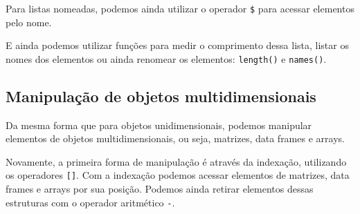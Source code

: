 \documentclass[
]{book}
\newenvironment{Shaded}{\begin{snugshade}}{\end{snugshade}}
\newcommand{\CommentTok}[1]{\textcolor[rgb]{0.37,0.37,0.37}{\textit{#1}}}
\newcommand{\DecValTok}[1]{\textcolor[rgb]{0.06,0.06,0.06}{#1}}
\newcommand{\DocumentationTok}[1]{\textcolor[rgb]{0.37,0.37,0.37}{\textbf{\textit{#1}}}}
\newcommand{\FunctionTok}[1]{\textcolor[rgb]{0,0,0}{#1}}
\newcommand{\NormalTok}[1]{#1}
\newcommand{\OtherTok}[1]{\textcolor[rgb]{0.37,0.37,0.37}{#1}}
\newcommand{\SpecialCharTok}[1]{\textcolor[rgb]{0,0,0}{#1}}
\newcommand{\StringTok}[1]{\textcolor[rgb]{0.5,0.5,0.5}{#1}}
\begin{document}
Para listas nomeadas, podemos ainda utilizar o operador \texttt{\$} para acessar elementos pelo nome.

\begin{Shaded}
\end{Shaded}

E ainda podemos utilizar funções para medir o comprimento dessa lista, listar os nomes dos elementos ou ainda renomear os elementos: \texttt{length()} e \texttt{names()}.

\begin{Shaded}
\end{Shaded}

\hypertarget{manipulauxe7uxe3o-de-objetos-multidimensionais}{%
\subsection{Manipulação de objetos multidimensionais}\label{manipulauxe7uxe3o-de-objetos-multidimensionais}}

Da mesma forma que para objetos unidimensionais, podemos manipular elementos de objetos multidimensionais, ou seja, matrizes, data frames e arrays.

Novamente, a primeira forma de manipulação é através da indexação, utilizando os operadores \texttt{{[}{]}}. Com a indexação podemos acessar elementos de matrizes, data frames e arrays por sua posição. Podemos ainda retirar elementos dessas estruturas com o operador aritmético \texttt{-}.
\end{document}
